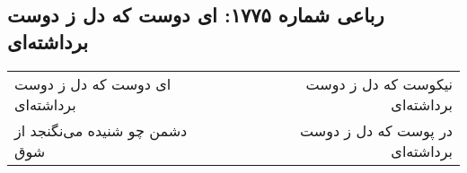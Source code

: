 \begin{center}
\section*{رباعی شماره ۱۷۷۵: ای دوست که دل ز دوست برداشته‌ای}
\label{sec:1775}
\begin{longtable}{l p{0.5cm} r}
ای دوست که دل ز دوست برداشته‌ای
&&
نیکوست که دل ز دوست برداشته‌ای
\\
دشمن چو شنیده می‌نگنجد از شوق
&&
در پوست که دل ز دوست برداشته‌ای
\\
\end{longtable}
\end{center}
